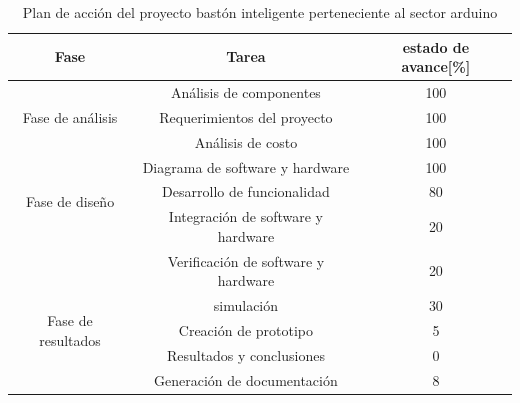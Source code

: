 \begin{table}[ht!]
	\centering
	\begin{tabular}{|c|c|c|}
		\hline 
		Fase & Tarea & estado de avance[\%] \\ 
		\hline 
		\multirow{3}{4cm}{Fase de análisis} & Análisis de componentes & 100 \\ \cline{2-3}   
		&  Requerimientos del proyecto &100 \\ \cline{2-3}   
		&  Análisis de costo &  100 \\  \hline
		\multirow{3}{4cm}{Fase de diseño} & Diagrama de software y hardware & 100 \\  \cline{2-3}
		&Desarrollo de funcionalidad & 80  \\ \cline{2-3} 
		&Integración de software y hardware & 20  \\ \cline{2-3} 
		&Verificación de software y hardware & 20  \\ \hline 
		\multirow{3}{4cm}{Fase de resultados} & simulación & 30\\  \cline{2-3}
		&Creación de prototipo& 5     \\  \cline{2-3}
		&Resultados y conclusiones& 0 \\  \cline{2-3}
		&Generación de documentación & 8 \\ \hline 		
	\end{tabular}
\caption{Plan de acción del proyecto bastón inteligente perteneciente al sector arduino}
\end{table}



 

